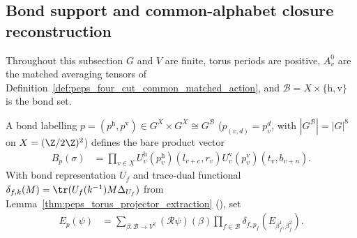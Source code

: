 \subsection{Bond support and common-alphabet closure reconstruction}
\label{sec:peps_four_cut_common_reconstruction}

Throughout this subsection $G$ and $V$ are finite, torus periods are positive, $A^0_v$ are the matched averaging tensors of Definition~\ref{def:peps_four_cut_common_matched_action}, and $\mathcal B=X\times\{\mathrm h,\mathrm v\}$ is the bond set.

\begin{definition}%
    \label{def:peps_four_cut_common_bond_coefficients}
    \leanok
    A bond labelling $p=(p^{\mathrm h},p^{\mathrm v})\in G^X\times G^X\cong G^{\mathcal B}$ ($p_{(v,d)}=p^d_v$, with $|G^{\mathcal B}|=|G|^8$ on $X=(\Z/2\Z)^2$) defines the bare product vector
    \begin{align}
        B_p(\sigma) & =\prod_{v\in X}
        U^{\mathrm h}_v(p^{\mathrm h}_v)(l_{v+e},r_v)
        U^{\mathrm v}_v(p^{\mathrm v}_v)(t_v,b_{v+n}).
        \label{eq:peps_common_bond_product}
    \end{align}
    With bond representation $U_f$ and trace-dual functional $\delta_{f,k}(M)=\tr(U_f(k^{-1})M\Delta_{U_f})$ from Lemma~\ref{thm:peps_torus_projector_extraction} (\cite[Lemma~4.6]{Schuch2010PEPS}), set
    \begin{align}
        E_p(\psi) & =\sum_{\beta:\mathcal B\to V^2}
        (\mathcal R\psi)(\beta)
        \prod_{f\in\mathcal B}\delta_{f,p_f}
        (E_{\beta_f^1,\beta_f^2}).
        \label{eq:peps_common_bond_extraction}
    \end{align}
\end{definition}

